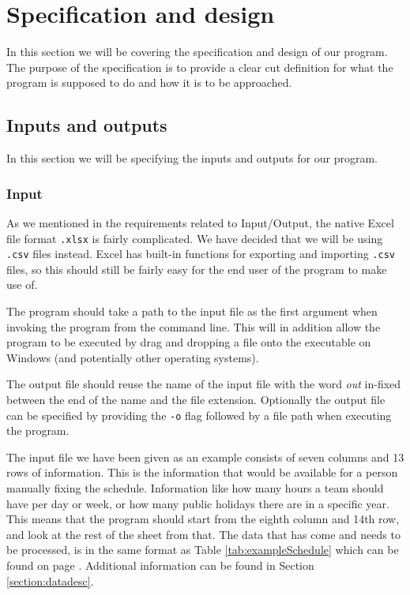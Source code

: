 \section{Specification and design}
In this section we will be covering the specification and design of our program. The purpose of the specification is to provide a clear cut definition for what the program is supposed to do and how it is to be approached.

\subsection{Inputs and outputs}
In this section we will be specifying the inputs and outputs for our program.

\subsubsection{Input}
As we mentioned in the requirements related to Input/Output, the native Excel file format \verb|.xlsx| is fairly complicated. We have decided that we will be using \verb|.csv| files instead. Excel has built-in functions for exporting and importing \verb|.csv| files, so this should still be fairly easy for the end user of the program to make use of.

The program should take a path to the input file as the first argument when invoking the program from the command line. This will in addition allow the program to be executed by drag and dropping a file onto the executable on Windows (and potentially other operating systems).

The output file should reuse the name of the input file with the word \textit{out} in-fixed between the end of the name and the file extension. Optionally the output file can be specified by providing the \verb|-o| flag followed by a file path when executing the program.

The input file we have been given as an example consists of seven columns and 13 rows of information. This is the information that would be available for a person manually fixing the schedule. Information like how many hours a team should have per day or week, or how many public holidays there are in a specific year. This means that the program should start from the eighth column and 14th row, and look at the rest of the sheet from that. The data that has come and needs to be processed, is in the same format as Table \ref{tab:exampleSchedule} which can be found on page \pageref{tab:exampleSchedule}. Additional information can be found in Section \ref{section:datadesc}.

